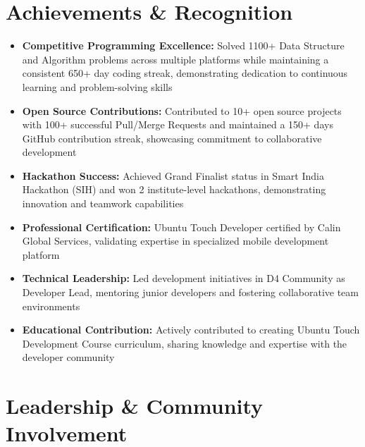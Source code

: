 \documentclass[a4paper,12pt]{article}
\begin{document}
\section{Achievements \& Recognition}
\begin{itemize}[nosep,after=\strut, leftmargin=1em, itemsep=3pt,label=--]
\item \textbf{Competitive Programming Excellence:} Solved 1100+ Data Structure and Algorithm problems across multiple platforms while maintaining a consistent 650+ day coding streak, demonstrating dedication to continuous learning and problem-solving skills
\item \textbf{Open Source Contributions:} Contributed to 10+ open source projects with 100+ successful Pull/Merge Requests and maintained a 150+ days GitHub contribution streak, showcasing commitment to collaborative development
\item \textbf{Hackathon Success:} Achieved Grand Finalist status in Smart India Hackathon (SIH) and won 2 institute-level hackathons, demonstrating innovation and teamwork capabilities
\item \textbf{Professional Certification:} Ubuntu Touch Developer certified by Calin Global Services, validating expertise in specialized mobile development platform
\item \textbf{Technical Leadership:} Led development initiatives in D4 Community as Developer Lead, mentoring junior developers and fostering collaborative team environments
\item \textbf{Educational Contribution:} Actively contributed to creating Ubuntu Touch Development Course curriculum, sharing knowledge and expertise with the developer community
\end{itemize}

\section{Leadership \& Community Involvement}
\end{document}
